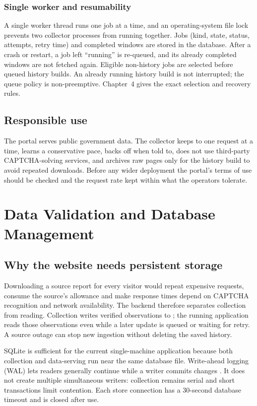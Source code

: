 \documentclass[12pt,a4paper,oneside]{report}
\numberwithin{equation}{chapter}
\numberwithin{figure}{chapter}
\numberwithin{table}{chapter}
\theoremstyle{definition}
\begin{document}
\subsection{Single worker and resumability}
A single worker thread runs one job at a time, and an operating-system file lock prevents two collector processes from running together. Jobs (kind, state, status, attempts, retry time) and completed windows are stored in the database. After a crash or restart, a job left ``running'' is re-queued, and its already completed windows are not fetched again. Eligible non-history jobs are selected before queued history builds. An already running history build is not interrupted; the queue policy is non-preemptive. Chapter~4 gives the exact selection and recovery rules.

\section{Responsible use}\label{sec:responsible}
The portal serves public government data. The collector keeps to one request at a time, learns a conservative pace, backs off when told to, does not use third-party CAPTCHA-solving services, and archives raw pages only for the history build to avoid repeated downloads. Before any wider deployment the portal's terms of use should be checked and the request rate kept within what the operators tolerate.

\chapter{Data Validation and Database Management}

\section{Why the website needs persistent storage}
Downloading a source report for every visitor would repeat expensive requests, consume the source's allowance and make response times depend on CAPTCHA recognition and network availability. The backend therefore separates collection from reading. Collection writes verified observations to ; the running application reads those observations even while a later update is queued or waiting for retry. A source outage can stop new ingestion without deleting the saved history.

SQLite is sufficient for the current single-machine application because both collection and data-serving run near the same database file. Write-ahead logging (WAL) lets readers generally continue while a writer commits changes \cite{sqlitewal}. It does not create multiple simultaneous writers: collection remains serial and short transactions limit contention. Each store connection has a 30-second database timeout and is closed after use.
\end{document}
